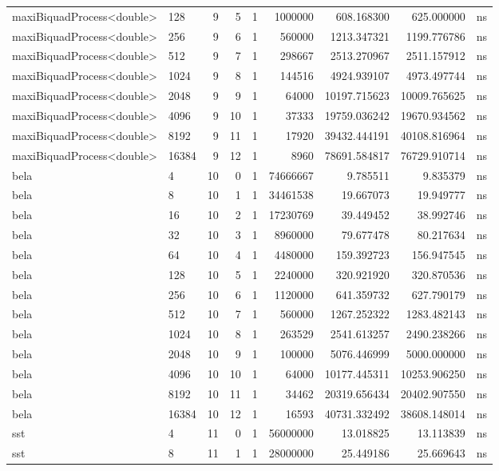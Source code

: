 \begin{tabular}{llrrrrrrl}
maxiBiquadProcess<double> & 128 & 9 & 5 & 1 & 1000000 & 608.168300 & 625.000000 & ns \\
maxiBiquadProcess<double> & 256 & 9 & 6 & 1 & 560000 & 1213.347321 & 1199.776786 & ns \\
maxiBiquadProcess<double> & 512 & 9 & 7 & 1 & 298667 & 2513.270967 & 2511.157912 & ns \\
maxiBiquadProcess<double> & 1024 & 9 & 8 & 1 & 144516 & 4924.939107 & 4973.497744 & ns \\
maxiBiquadProcess<double> & 2048 & 9 & 9 & 1 & 64000 & 10197.715623 & 10009.765625 & ns \\
maxiBiquadProcess<double> & 4096 & 9 & 10 & 1 & 37333 & 19759.036242 & 19670.934562 & ns \\
maxiBiquadProcess<double> & 8192 & 9 & 11 & 1 & 17920 & 39432.444191 & 40108.816964 & ns \\
maxiBiquadProcess<double> & 16384 & 9 & 12 & 1 & 8960 & 78691.584817 & 76729.910714 & ns \\
bela & 4 & 10 & 0 & 1 & 74666667 & 9.785511 & 9.835379 & ns \\
bela & 8 & 10 & 1 & 1 & 34461538 & 19.667073 & 19.949777 & ns \\
bela & 16 & 10 & 2 & 1 & 17230769 & 39.449452 & 38.992746 & ns \\
bela & 32 & 10 & 3 & 1 & 8960000 & 79.677478 & 80.217634 & ns \\
bela & 64 & 10 & 4 & 1 & 4480000 & 159.392723 & 156.947545 & ns \\
bela & 128 & 10 & 5 & 1 & 2240000 & 320.921920 & 320.870536 & ns \\
bela & 256 & 10 & 6 & 1 & 1120000 & 641.359732 & 627.790179 & ns \\
bela & 512 & 10 & 7 & 1 & 560000 & 1267.252322 & 1283.482143 & ns \\
bela & 1024 & 10 & 8 & 1 & 263529 & 2541.613257 & 2490.238266 & ns \\
bela & 2048 & 10 & 9 & 1 & 100000 & 5076.446999 & 5000.000000 & ns \\
bela & 4096 & 10 & 10 & 1 & 64000 & 10177.445311 & 10253.906250 & ns \\
bela & 8192 & 10 & 11 & 1 & 34462 & 20319.656434 & 20402.907550 & ns \\
bela & 16384 & 10 & 12 & 1 & 16593 & 40731.332492 & 38608.148014 & ns \\
sst & 4 & 11 & 0 & 1 & 56000000 & 13.018825 & 13.113839 & ns \\
sst & 8 & 11 & 1 & 1 & 28000000 & 25.449186 & 25.669643 & ns \\

\end{tabular}
